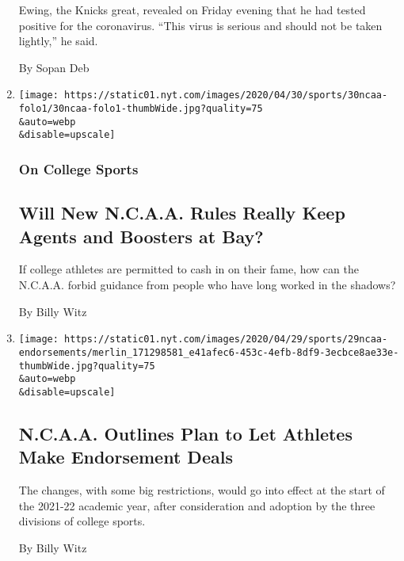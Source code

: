 \begin{enumerate}
  Ewing, the Knicks great, revealed on Friday evening that he had tested
  positive for the coronavirus. ``This virus is serious and should not
  be taken lightly,'' he said.

  By Sopan Deb
\item
  \href{/2020/05/01/sports/ncaa-paying-athletes-boosters.html}{}

  \texttt{[image: https://static01.nyt.com/images/2020/04/30/sports/30ncaa-folo1/30ncaa-folo1-thumbWide.jpg?quality=75\\\&auto=webp\\\&disable=upscale]}

  \hypertarget{on-college-sports}{%
  \subsubsection{On College Sports}\label{on-college-sports}}

  \hypertarget{will-new-ncaa-rules-really-keep-agents-and-boosters-at-bay}{%
  \subsection{Will New N.C.A.A. Rules Really Keep Agents and Boosters at
  Bay?}\label{will-new-ncaa-rules-really-keep-agents-and-boosters-at-bay}}

  If college athletes are permitted to cash in on their fame, how can
  the N.C.A.A. forbid guidance from people who have long worked in the
  shadows?

  By Billy Witz
\item
  \href{/2020/04/29/sports/ncaabasketball/ncaa-athlete-endorsements.html}{}

  \texttt{[image: https://static01.nyt.com/images/2020/04/29/sports/29ncaa-endorsements/merlin\_171298581\_e41afec6-453c-4efb-8df9-3ecbce8ae33e-thumbWide.jpg?quality=75\\\&auto=webp\\\&disable=upscale]}

  \hypertarget{ncaa-outlines-plan-to-let-athletes-make-endorsement-deals}{%
  \subsection{N.C.A.A. Outlines Plan to Let Athletes Make Endorsement
  Deals}\label{ncaa-outlines-plan-to-let-athletes-make-endorsement-deals}}

  The changes, with some big restrictions, would go into effect at the
  start of the 2021-22 academic year, after consideration and adoption
  by the three divisions of college sports.

  By Billy Witz
\end{enumerate}

